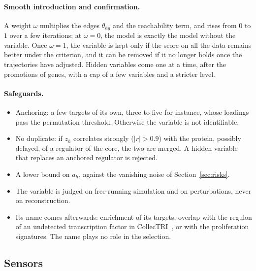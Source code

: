 \documentclass[a4paper, 11pt]{article}
\theoremstyle{plain}
\theoremstyle{remark}
\begin{document}
\paragraph{Smooth introduction and confirmation.} A weight $\omega$ multiplies the edges $\theta_{hg}$ and the reachability term, and rises from $0$ to $1$ over a few iterations; at $\omega = 0$, the model is exactly the model without the variable. Once $\omega = 1$, the variable is kept only if the score on all the data remains better under the criterion, and it can be removed if it no longer holds once the trajectories have adjusted. Hidden variables come one at a time, after the promotions of genes, with a cap of a few variables and a stricter level.

\paragraph{Safeguards.}
\begin{itemize}[nosep]
\item Anchoring: a few targets of its own, three to five for instance, whose loadings pass the permutation threshold. Otherwise the variable is not identifiable.
\item No duplicate: if $z_h$ correlates strongly ($|r| > 0.9$) with the protein, possibly delayed, of a regulator of the core, the two are merged. A hidden variable that replaces an anchored regulator is rejected.
\item A lower bound on $a_h$, against the vanishing noise of Section~\ref{sec:risks}.
\item The variable is judged on free-running simulation and on perturbations, never on reconstruction.
\item Its name comes afterwards: enrichment of its targets, overlap with the regulon of an undetected transcription factor in CollecTRI~\cite{muller2023expanding}, or with the proliferation signatures. The name plays no role in the selection.
\end{itemize}

\subsection{Sensors}\label{sec:sensors}
\end{document}
